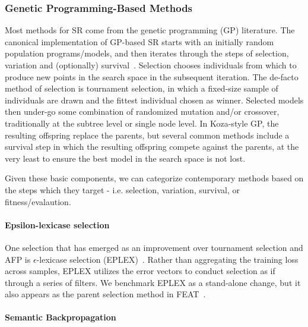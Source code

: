 

\subsubsection{Genetic Programming-Based Methods}

Most methods for SR come from the genetic programming (GP) literature. 
The canonical implementation of GP-based SR starts with an initially random population programs/models, and then iterates through the steps of selection, variation and (optionally) survival~\cite{poliFieldGuideGenetic2008}.
Selection chooses individuals from which to produce new points in the search space in the subsequent iteration. 
The de-facto method of selection is tournament selection, in which a fixed-size sample of individuals are drawn and the fittest individual chosen as winner. 
Selected models then under-go some combination of randomized mutation and/or crossover, traditionally at the subtree level or single node level.
In Koza-style GP, the resulting offspring replace the parents, but several common methods include a survival step in which the resulting offspring compete against the parents, at the very least to ensure the best model in the search space is not lost.

Given these basic components, we can categorize contemporary methods based on the steps which they target - i.e. selection, variation, survival, or fitness/evalaution. 


\paragraph{Epsilon-lexicase selection}

One selection that has emerged as an improvement over tournament selection and AFP is $\epsilon$-lexicase selection (EPLEX)~\cite{lacavaEpsilonLexicaseSelectionRegression2016c}. 
Rather than aggregating the training loss across samples, EPLEX utilizes the error vectors to conduct selection as if through a series of filters. 
We benchmark EPLEX as a stand-alone change, but it also appears as the parent selection method in FEAT~\cite{lacavaLearningConciseRepresentations2019c}. 

\paragraph{Semantic Backpropagation}

